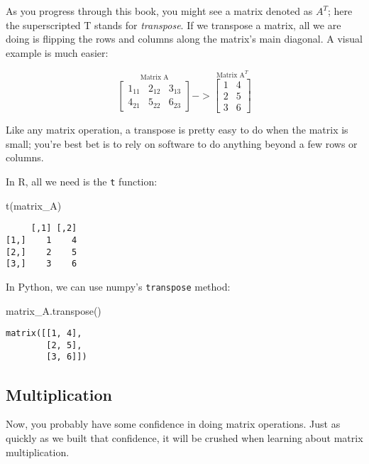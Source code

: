 \documentclass[
]{krantz}
\newenvironment{Shaded}{\begin{snugshade}}{\end{snugshade}}
\newcommand{\FunctionTok}[1]{\textcolor[rgb]{0.28,0.35,0.67}{#1}}
\newcommand{\NormalTok}[1]{\textcolor[rgb]{0.00,0.23,0.31}{#1}}
\begin{document}
As you progress through this book, you might see a matrix denoted as
\(A^T\); here the superscripted T stands for \emph{transpose}. If we
transpose a matrix, all we are doing is flipping the rows and columns
along the matrix's main diagonal. A visual example is much easier:

\[
\stackrel{\mbox{Matrix A}}{
\begin{bmatrix}
1_{11} & 2_{12} & 3_{13}\\
4_{21} & 5_{22} & 6_{23}
\end{bmatrix}
}
->
\stackrel{\mbox{Matrix A}^T}{
\begin{bmatrix}
1 & 4 \\
2 & 5 \\
3 & 6
\end{bmatrix}
}
\]

Like any matrix operation, a transpose is pretty easy to do when the
matrix is small; you're best bet is to rely on software to do anything
beyond a few rows or columns.

In R, all we need is the \texttt{t} function:

\begin{Shaded}
\begin{Highlighting}[]
\FunctionTok{t}\NormalTok{(matrix\_A)}
\end{Highlighting}
\end{Shaded}

\begin{verbatim}
     [,1] [,2]
[1,]    1    4
[2,]    2    5
[3,]    3    6
\end{verbatim}

In Python, we can use numpy's \texttt{transpose} method:

\begin{Shaded}
\begin{Highlighting}[]
\NormalTok{matrix\_A.transpose()}
\end{Highlighting}
\end{Shaded}

\begin{verbatim}
matrix([[1, 4],
        [2, 5],
        [3, 6]])
\end{verbatim}

\hypertarget{multiplication}{%
\subsection{Multiplication}\label{multiplication}}

Now, you probably have some confidence in doing matrix operations. Just
as quickly as we built that confidence, it will be crushed when learning
about matrix multiplication.
\end{document}
